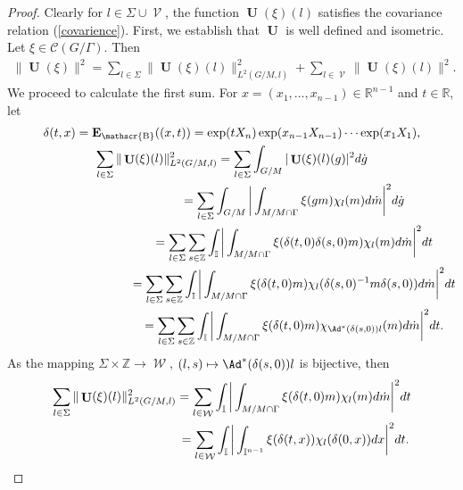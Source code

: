 \documentclass[11pt]{article}
\providecommand{\mathds}[1]{\mathbb{#1}}
\DeclareMathOperator{\U}{\mathbf{U}}
\DeclareMathOperator{\nongen}{\mathcal{V}}
\DeclareMathOperator{\gen}{\mathcal{W}}
\DeclareMathOperator{\bbase}{\mathscr{B}}
\def\tore{{\mathbb I}}
\begin{document}
\begin{proof} Clearly
for $ l \in \Sigma\cup \nongen$, the function $ \U(\xi)(l)$
satisf\/ies the covariance relation (\ref{covarience}). First, we
establish that $\U$ is well def\/ined and isometric. Let $\xi\in
\mathcal{C}(G/\Gamma)$. Then
\begin{gather*}
  \|\U(\xi)\|^2  = \sum_{l \in \Sigma}\|\U(\xi)(l)\|^2_{L^2(G/M, l)} + \sum_{l\in
  \nongen}
    \|\U(\xi)(l)\|^2.
\end{gather*}
We proceed to calculate the f\/irst sum. For $x=(x_1,\ldots, x_{n-1})
\in \mathds{R}^{n-1}$ and $ t\in \mathds{R}$, let
\begin{gather*}
\delta(t, x) = \mathbf{E}_{\bbase}((x, t))= \exp(t X_n) \exp(x_{n-1} X_{n-1})\cdots \exp(x_1
X_1),
\\
\sum_{l\in \Sigma} \|\U(\xi)(l)\|^2_{L^2(G/M, l)}
   = \sum_{l\in \Sigma} \int_{G/M} | \U(\xi)(l)(g)|^2     d\dot{g }\\
 \hphantom{\sum_{l\in \Sigma} \|\U(\xi)(l)\|^2_{L^2(G/M, l)}} {}
  =  \sum_{l\in \Sigma} \int_{G/M} \bigg| \int_{M/M\cap \Gamma}
\xi(gm) \chi_l(m) d\dot{m}\bigg|^2     d\dot{g}\\
\hphantom{\sum_{l\in \Sigma} \|\U(\xi)(l)\|^2_{L^2(G/M, l)}} {} = \sum_{l\in \Sigma} \sum_{s\in \mathds{Z}} \int_{\tore} \bigg|
\int_{M/M\cap \Gamma} \xi(\delta(t, 0)\delta(s, 0)  m) \chi_l (m)
 d\dot{m} \bigg|^2  dt \\
\hphantom{\sum_{l\in \Sigma} \|\U(\xi)(l)\|^2_{L^2(G/M, l)}} {} =
\sum_{l\in \Sigma} \sum_{s\in \mathds{Z}} \int_{\tore} \bigg|
\int_{M/M\cap \Gamma} \xi(\delta(t, 0)  m) \chi_l ( \delta(s,
0)^{-1} m \delta(s, 0))
 d\dot{m} \bigg|^2  dt\\
\hphantom{\sum_{l\in \Sigma} \|\U(\xi)(l)\|^2_{L^2(G/M, l)}} {}  =  \sum_{l\in \Sigma} \sum_{s\in
\mathds{Z}} \int_{\tore}  \bigg| \int_{M/M\cap \Gamma} \xi(\delta(t, 0)
m) \chi_{\Ad^*(\delta(s, 0))l} (m)
 d\dot{m} \bigg|^2  dt .
\end{gather*}
As the mapping $\Sigma\times \mathds{Z}\rightarrow \gen$, $(l, s) \mapsto \Ad^*(\delta(s, 0))l$
 is bijective, then
 \begin{gather*}
 \sum_{l\in \Sigma} \|\U(\xi)(l)\|^2_{L^2(G/M, l)}
   =  \sum_{l\in \gen}  \int_{\tore}  \bigg| \int_{M/M\cap
\Gamma} \xi(\delta(t, 0) m) \chi_l (m)
 d\dot{m} \bigg|^2  dt  \\
 \hphantom{\sum_{l\in \Sigma} \|\U(\xi)(l)\|^2_{L^2(G/M, l)}}{}
  =  \sum_{l\in \gen}  \int_{\tore}
 \bigg|
 \int_{\tore^{n-1}} \xi(\delta(t, x))
  \chi_l (\delta(0, x))
 dx  \bigg|^2  dt.

\end{gather*}
\end{proof}
\end{document}
